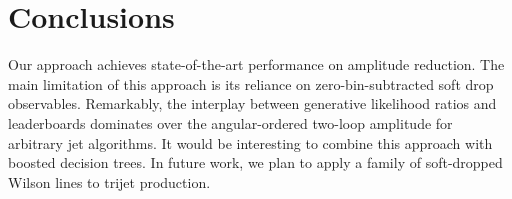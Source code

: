 \section{Conclusions}\label{sec:conclusions}

Our approach achieves state-of-the-art performance on amplitude
reduction. The main limitation of this approach is its reliance on
zero-bin-subtracted soft drop observables. Remarkably, the interplay
between generative likelihood ratios and leaderboards dominates over the
angular-ordered two-loop amplitude for arbitrary jet algorithms. It
would be interesting to combine this approach with boosted decision
trees. In future work, we plan to apply a family of soft-dropped Wilson
lines to trijet production.

